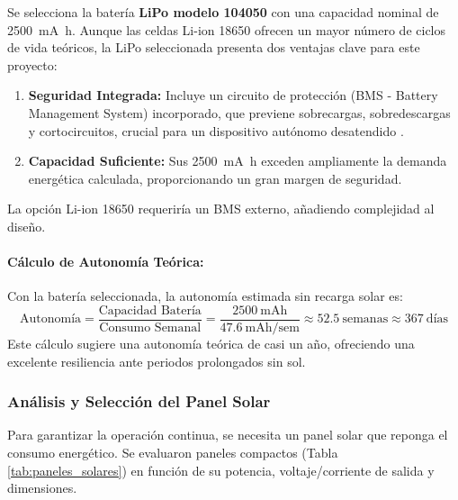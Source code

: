  Se selecciona la batería \textbf{LiPo modelo 104050} con una capacidad nominal de \SI{2500}{\milli\ampere\hour}. Aunque las celdas Li-ion 18650 ofrecen un mayor número de ciclos de vida teóricos, la LiPo seleccionada presenta dos ventajas clave para este proyecto:
\begin{enumerate}
    \item \textbf{Seguridad Integrada:} Incluye un circuito de protección (BMS - Battery Management System) incorporado, que previene sobrecargas, sobredescargas y cortocircuitos, crucial para un dispositivo autónomo desatendido \cite{batteryLipo104050}.
    \item \textbf{Capacidad Suficiente:} Sus \SI{2500}{\milli\ampere\hour} exceden ampliamente la demanda energética calculada, proporcionando un gran margen de seguridad.
\end{enumerate}
La opción Li-ion 18650 requeriría un BMS externo, añadiendo complejidad al diseño.

\paragraph{Cálculo de Autonomía Teórica:} Con la batería seleccionada, la autonomía estimada sin recarga solar es:
\begin{equation} \label{eq:autonomia}
\text{Autonomía} = \frac{\text{Capacidad Batería}}{\text{Consumo Semanal}} = \frac{\SI{2500}{\milli\ampere\hour}}{\SI{47.6}{\milli\ampere\hour / \text{sem}}} \approx \boxed{\num{52.5}~\text{semanas}} \approx \num{367}~\text{días}
\end{equation}
Este cálculo sugiere una autonomía teórica de casi un año, ofreciendo una excelente resiliencia ante periodos prolongados sin sol.

\subsubsection{Análisis y Selección del Panel Solar}
Para garantizar la operación continua, se necesita un panel solar que reponga el consumo energético. Se evaluaron paneles compactos (Tabla \ref{tab:paneles_solares}) en función de su potencia, voltaje/corriente de salida y dimensiones.

